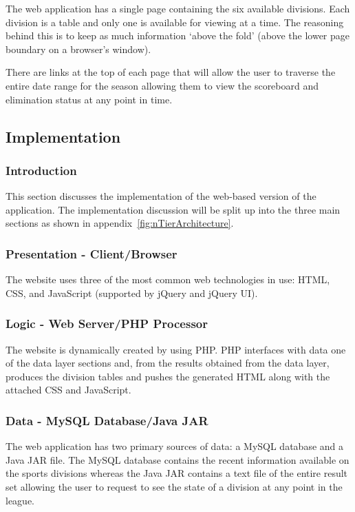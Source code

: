 The web application has a single page containing the six available divisions.
Each division is a table and only one is available for viewing at a time. The 
reasoning behind this is to keep as much information `above the fold' (above the
lower page boundary on a browser's window).

There are links at the top of each page that will allow the user to traverse
the entire date range for the season allowing them to view the scoreboard and
elimination status at any point in time.

\subsection{Implementation}

\subsubsection{Introduction}

This section discusses the implementation of the web-based version of the
application. The implementation discussion will be split up into the three
main sections as shown in appendix~\ref{fig:nTierArchitecture}.

\subsubsection{Presentation - Client/Browser}

The website uses three of the most common web technologies in use: HTML, CSS,
and JavaScript (supported by jQuery and jQuery UI).

\subsubsection{Logic - Web Server/PHP Processor}

The website is dynamically created by using PHP. PHP interfaces with data one
of the data layer sections and, from the results obtained from the data layer,
produces the division tables and pushes the generated HTML along with the
attached CSS and JavaScript.

\subsubsection{Data - MySQL Database/Java JAR}

The web application has two primary sources of data: a MySQL database and a
Java JAR file. The MySQL database contains the recent information available
on the sports divisions whereas the Java JAR contains a text file of the entire
result set allowing the user to request to see the state of a division at any
point in the league.
